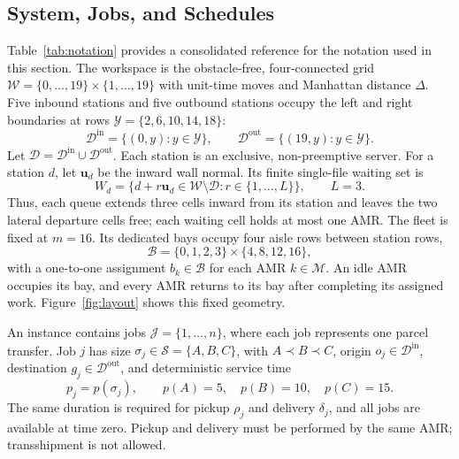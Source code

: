 \subsection{System, Jobs, and Schedules}
\label{sec:system}

Table~\ref{tab:notation} provides a consolidated reference for the notation
used in this section. The workspace is the obstacle-free, four-connected grid
$\mathcal W=\{0,\ldots,19\}\times\{1,\ldots,19\}$ with unit-time moves and
Manhattan distance $\Delta$. Five inbound stations and five outbound stations
occupy the left and right boundaries at rows
$\mathcal Y=\{2,6,10,14,18\}$:
\begin{equation}
 \mathcal D^{\mathrm{in}}=\{(0,y):y\in\mathcal Y\},\qquad
 \mathcal D^{\mathrm{out}}=\{(19,y):y\in\mathcal Y\}.
 \label{eq:stations}
\end{equation}
Let $\mathcal D=\mathcal D^{\mathrm{in}}\cup\mathcal D^{\mathrm{out}}$.
Each station is an exclusive, non-preemptive server. For a station $d$, let
$\bm u_d$ be the inward wall normal. Its finite single-file waiting set is
\begin{equation}
 W_d=\{d+r\bm u_d\in\mathcal W\setminus\mathcal D:
 r\in\{1,\ldots,L\}\},\qquad L=3.
 \label{eq:waitset}
\end{equation}
Thus, each queue extends three cells inward from its station and leaves the
two lateral departure cells free; each waiting cell holds at most one AMR.
The fleet is fixed at $m=16$. Its dedicated bays occupy four aisle rows
between station rows,
\begin{equation}
 \mathcal B=\{0,1,2,3\}\times\{4,8,12,16\},
 \label{eq:bays}
\end{equation}
with a one-to-one assignment $b_k\in\mathcal B$ for each AMR
$k\in\mathcal M$. An idle AMR occupies its bay, and every AMR returns to its
bay after completing its assigned work. Figure~\ref{fig:layout} shows this
fixed geometry.

An instance contains jobs $\mathcal J=\{1,\ldots,n\}$, where each job
represents one parcel transfer. Job $j$ has size
$\sigma_j\in\mathcal S=\{A,B,C\}$, with $A\prec B\prec C$, origin
$o_j\in\mathcal D^{\mathrm{in}}$, destination
$g_j\in\mathcal D^{\mathrm{out}}$, and deterministic service time
\begin{equation}
 p_j=p(\sigma_j),\qquad p(A)=5,\quad p(B)=10,\quad p(C)=15.
 \label{eq:service}
\end{equation}
The same duration is required for pickup $\rho_j$ and delivery $\delta_j$,
and all jobs are available at time zero. Pickup and delivery must be
performed by the same AMR; transshipment is not allowed.

